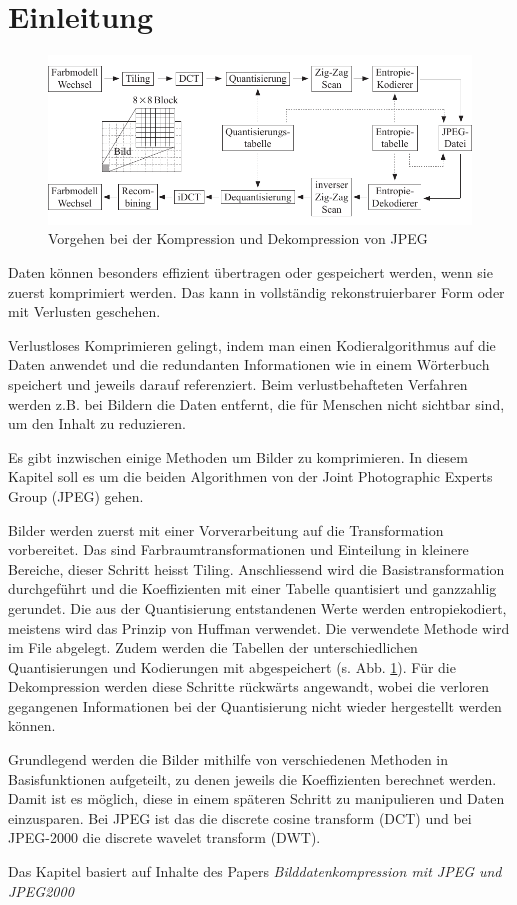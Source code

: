 %
%
%
%
\section{Einleitung\label{jpeg:section:einleitung}}
\begin{figure}
    \centering
    \includegraphics[width=\linewidth]{papers/jpeg/pictures/kompressionsschema.pdf}
    \caption{Vorgehen bei der Kompression und Dekompression von JPEG
        \label{jpeg:fig:kompressionsschema}}
\end{figure}
Daten können besonders effizient übertragen oder gespeichert werden, wenn sie zuerst komprimiert werden.
Das kann in vollständig rekonstruierbarer Form oder mit Verlusten geschehen.

Verlustloses Komprimieren gelingt, indem man einen Kodieralgorithmus auf die Daten anwendet und die redundanten Informationen wie in einem Wörterbuch speichert und jeweils darauf referenziert. Beim verlustbehafteten Verfahren werden z.B. bei Bildern die Daten entfernt, die für Menschen nicht sichtbar sind, um den Inhalt zu reduzieren.

Es gibt inzwischen einige Methoden um Bilder zu komprimieren.
In diesem Kapitel soll es um die beiden Algorithmen von der Joint Photographic Experts Group (JPEG) gehen.


Bilder werden zuerst mit einer Vorverarbeitung auf die Transformation vorbereitet.
Das sind Farb\-raumtransformationen und Einteilung in kleinere Bereiche, dieser Schritt heisst Tiling.
Anschliessend wird die Basistransformation durchgeführt und die Koeffizienten mit einer Tabelle quantisiert und ganzzahlig gerundet.
Die aus der Quantisierung entstandenen Werte werden entropiekodiert, meistens wird das Prinzip von Huffman verwendet.
Die verwendete Methode wird im File abgelegt.
Zudem werden die Tabellen der unterschiedlichen Quantisierungen und Kodierungen mit abgespeichert (s. Abb. \ref{jpeg:fig:kompressionsschema}).
Für die Dekompression werden diese Schritte rückwärts angewandt, wobei die verloren gegangenen Informationen bei der Quantisierung nicht wieder hergestellt werden können. 

Grundlegend werden die Bilder mithilfe von verschiedenen Methoden in Basisfunktionen aufgeteilt, zu denen jeweils die Koeffizienten berechnet werden.
Damit ist es möglich, diese in einem späteren Schritt zu manipulieren und Daten einzusparen. 
Bei JPEG ist das die discrete cosine transform (DCT) und bei JPEG-2000 die discrete wavelet transform (DWT).

Das Kapitel basiert auf Inhalte des Papers \textit{Bilddatenkompression mit JPEG und JPEG2000} \cite{jpeg:laurahochstrat}